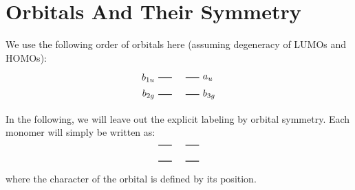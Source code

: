 \documentclass{article}
\begin{document}
    
    \pagestyle{empty}
    \tableofcontents 
    \newpage 
    
    \section{Orbitals And Their Symmetry}%
\vspace{2cm}
We use the following order of orbitals here (assuming degeneracy of LUMOs and HOMOs): 
$$
\begin{tikzpicture}
            \draw[thick] (0,0) -- (0.5,0)
                node[pos=0, left] {$b_{1u}$}
                ;
            \draw[thick] (1,0) -- (1.5,0)
                node[pos=1, right] {$a_{u}$}
                ;
            \draw[thick] (0,-0.6) -- (0.5,-0.6)
                node[pos=0, left] {$b_{2g}$}
                ;
            \draw[thick] (1,-0.6) -- (1.5,-0.6)
                node[pos=1, right] {$b_{3g}$}
                ;
        
\end{tikzpicture}
$$
In the following, we will leave out the explicit labeling by orbital symmetry. Each monomer will simply be written as:
$$
\begin{tikzpicture}
            \draw[thick] (0,0) -- (0.5,0)
                ;
            \draw[thick] (1,0) -- (1.5,0)
                ;
            \draw[thick] (0,-0.6) -- (0.5,-0.6)
                ;
            \draw[thick] (1,-0.6) -- (1.5,-0.6)
                ;
        
\end{tikzpicture}
$$
where the character of the orbital is defined by its position. 
\end{document}
